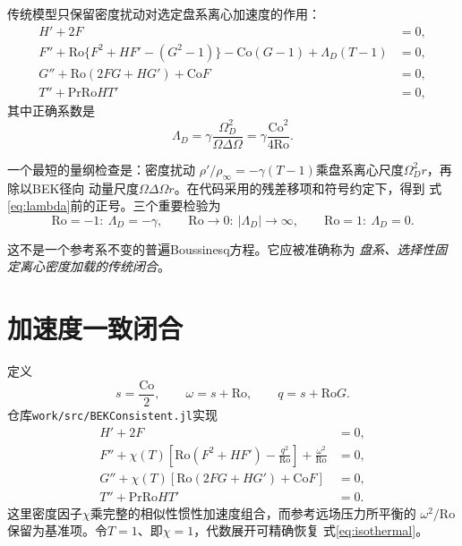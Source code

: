 \documentclass[UTF8,zihao=-4,openany]{ctexbook}
\newcommand{\Ro}{\mathrm{Ro}}
\newcommand{\Pran}{\mathrm{Pr}}
\newcommand{\Co}{\mathrm{Co}}
\begin{document}
传统模型只保留密度扰动对选定盘系离心加速度的作用：
\begin{subequations}\label{eq:traditional}
\begin{align}
 H'+2F&=0,\\
 F''+\Ro\{F^2+HF'-(G^2-1)\}-\Co(G-1)
 +\Lambda_D(T-1)&=0,\\
 G''+\Ro(2FG+HG')+\Co F&=0,\\
 T''+\Pran\Ro H T'&=0,
\end{align}
\end{subequations}
其中正确系数是
\begin{equation}\label{eq:lambda}
 \boxed{\Lambda_D=\gamma\frac{\Omega_D^2}{\Omega\Delta\Omega}
 =\gamma\frac{\Co^2}{4\Ro}.}
\end{equation}

一个最短的量纲检查是：密度扰动
$\rho'/\rho_\infty=-\gamma(T-1)$乘盘系离心尺度$\Omega_D^2r$，再除以BEK径向
动量尺度$\Omega\Delta\Omega r$。在代码采用的残差移项和符号约定下，得到
式\eqref{eq:lambda}前的正号。三个重要检验为
\begin{equation}
 \Ro=-1:\ \Lambda_D=-\gamma,\qquad
 \Ro\to0:\ |\Lambda_D|\to\infty,\qquad
 \Ro=1:\ \Lambda_D=0.
\end{equation}

这不是一个参考系不变的普遍Boussinesq方程。它应被准确称为
\emph{盘系、选择性固定离心密度加载的传统闭合}。

\section{加速度一致闭合}

定义
\begin{equation}
 s=\frac{\Co}{2},\qquad \omega=s+\Ro,\qquad q=s+\Ro G.
\end{equation}
仓库\texttt{work/src/BEKConsistent.jl}实现
\begin{subequations}\label{eq:consistent}
\begin{align}
 H'+2F&=0,\\
 F''+\chi(T)\left[\Ro(F^2+HF')-\frac{q^2}{\Ro}\right]
 +\frac{\omega^2}{\Ro}&=0,\\
 G''+\chi(T)\left[\Ro(2FG+HG')+\Co F\right]&=0,\\
 T''+\Pran\Ro H T'&=0.
\end{align}
\end{subequations}
这里密度因子$\chi$乘完整的相似性惯性加速度组合，而参考远场压力所平衡的
$\omega^2/\Ro$保留为基准项。令$T=1$、即$\chi=1$，代数展开可精确恢复
式\eqref{eq:isothermal}。
\end{document}
